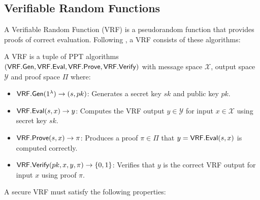 \subsection{Verifiable Random Functions}
A Verifiable Random Function (VRF) \cite{micali_verifiable_1999, hutchison_verifiable_2005} is a pseudorandom function that provides proofs of correct evaluation. Following \cite{bitansky_verifiable_2020}, a VRF consists of these algorithms:

\begin{definition}
A VRF is a tuple of PPT algorithms \\
$(\mathsf{VRF.Gen}, \mathsf{VRF.Eval}, \mathsf{VRF.Prove}, \mathsf{VRF.Verify})$ with message space $\mathcal{X}$, output space $\mathcal{Y}$ and proof space $\Pi$ where:
\begin{itemize}
    \item $\mathsf{VRF.Gen}(1^\lambda) \to (s, pk)$: Generates a secret key $sk$ and public key $pk$.
    \item $\mathsf{VRF.Eval}(s,x) \to y$: Computes the VRF output $y \in \mathcal{Y}$ for input $x \in \mathcal{X}$ using secret key $sk$.
    \item $\mathsf{VRF.Prove}(s,x) \to \pi$: Produces a proof $\pi \in \Pi$ that $y = \mathsf{VRF.Eval}(s,x)$ is computed correctly.
    \item $\mathsf{VRF.Verify}(pk,x,y,\pi) \to \{0,1\}$: Verifies that $y$ is the correct VRF output for input $x$ using proof $\pi$.
\end{itemize}
\end{definition}

A secure VRF must satisfy the following properties:

